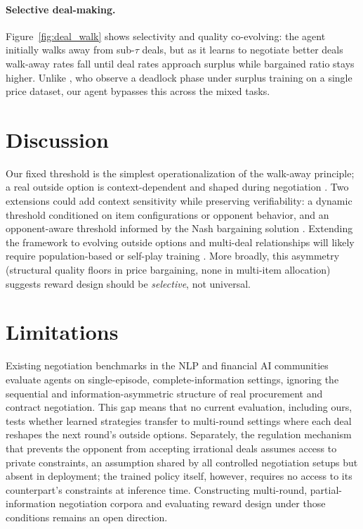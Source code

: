 \documentclass[11pt]{article}
\begin{document}
\paragraph{Selective deal-making.}
Figure~\ref{fig:deal_walk} shows selectivity and quality co-evolving: the agent initially walks away from sub-$\tau$ deals, but as it learns to negotiate better deals walk-away rates fall until deal rates approach surplus while bargained ratio stays higher. Unlike \citet{liu2026instructing}, who observe a deadlock phase under surplus training on a single price dataset, our agent bypasses this across the mixed tasks.

\section{Discussion}

Our fixed threshold is the simplest operationalization of the walk-away principle; a real outside option is context-dependent and shaped during negotiation \citep{fisher1981gettingtoyes, raiffa1982art}. Two extensions could add context sensitivity while preserving verifiability: a dynamic threshold conditioned on item configurations or opponent behavior, and an opponent-aware threshold informed by the Nash bargaining solution \citep{nash1950bargaining}. Extending the framework to evolving outside options and multi-deal relationships \citep{zeng2025repo} will likely require population-based or self-play training \citep{liu2025spiral}. More broadly, this asymmetry (structural quality floors in price bargaining, none in multi-item allocation) suggests reward design should be \textit{selective}, not universal.


\section*{Limitations}

Existing negotiation benchmarks in the NLP and financial AI communities evaluate agents on single-episode, complete-information settings, ignoring the sequential and information-asymmetric structure of real procurement and contract negotiation. This gap means that no current evaluation, including ours, tests whether learned strategies transfer to multi-round settings where each deal reshapes the next round's outside options. Separately, the regulation mechanism that prevents the opponent from accepting irrational deals assumes access to private constraints, an assumption shared by all controlled negotiation setups but absent in deployment; the trained policy itself, however, requires no access to its counterpart's constraints at inference time. Constructing multi-round, partial-information negotiation corpora and evaluating reward design under those conditions remains an open direction.
\end{document}
